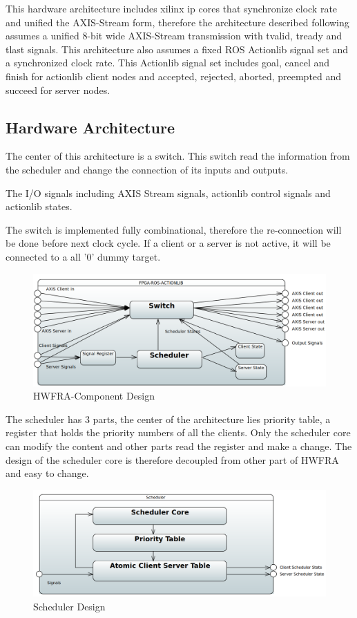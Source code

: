 This hardware architecture includes xilinx ip cores that synchronize clock rate and unified the AXIS-Stream form, therefore the architecture described following assumes a unified 8-bit wide AXIS-Stream transmission with tvalid, tready and tlast signals. This architecture also assumes a fixed ROS Actionlib signal set and a synchronized clock rate. This Actionlib signal set includes goal, cancel and finish for actionlib client nodes and accepted, rejected, aborted, preempted and succeed for server nodes.

\subsection{Hardware Architecture}

The center of this architecture is a switch. This switch read the information from the scheduler and change the connection of its inputs and outputs.

The I/O signals including AXIS Stream signals, actionlib control signals and actionlib states.

The switch is implemented fully combinational, therefore the re-connection will be done before next clock cycle. If a client or a server is not active, it will be connected to a all '0' dummy target.

 \begin{figure}[htb]
	\centering
	\includegraphics[width=.8\linewidth]{figures/fpac-tb.png}
	\caption{HWFRA-Component Design}
	\label{fig:hwfra-general}
\end{figure}

The scheduler has 3 parts, the center of the architecture lies priority table, a register that holds the priority numbers of all the clients. Only the scheduler core can modify the content and other parts read the register and make a change. The design of the scheduler core is therefore decoupled from other part of HWFRA and easy to change.



 \begin{figure}[htb]
	\centering
	\includegraphics[width=.8\linewidth]{figures/fp-sc.png}
	\caption{Scheduler Design}
	\label{fig:hwfra-scheduler}
\end{figure}

